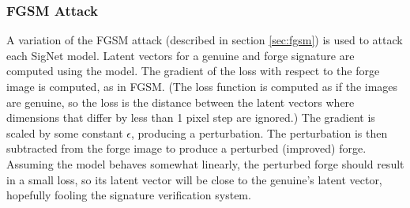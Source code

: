 





\subsubsection{FGSM Attack}\label{my_fgsm}
A variation of the FGSM attack (described in section \ref{sec:fgsm}) is used to attack each SigNet model.
Latent vectors for a genuine and forge signature are computed using the model.
The gradient of the loss with respect to the forge image is computed, as in FGSM.
(The loss function is computed as if the images are genuine, so the loss is the distance between the latent vectors where dimensions that differ by less than 1 pixel step are ignored.)
The gradient is scaled by some constant $\epsilon$, producing a perturbation.
The perturbation is then subtracted from the forge image to produce a perturbed (improved) forge.
Assuming the model behaves somewhat linearly, the perturbed forge should result in a small loss, so its latent vector will be close to the genuine's latent vector, hopefully fooling the signature verification system.

